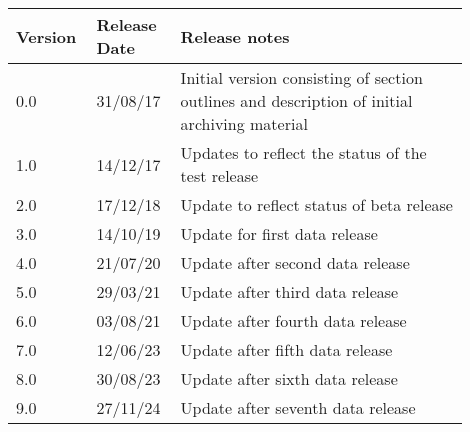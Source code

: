 \begin{table}[h]
\begin{tabular}{|p{0.15\linewidth}|p{0.15\linewidth}|p{0.60\linewidth}|}
\hline
\bfseries Version & \bfseries Release Date & \bfseries Release notes \\\hline
0.0	& 31/08/17	& Initial version consisting of section outlines and description of initial archiving material \\\hline
1.0	& 14/12/17	& Updates to reflect the status of the test release \\\hline
2.0	& 17/12/18	& Update to reflect status of beta release \\\hline
3.0	& 14/10/19	& Update for first data release \\\hline
4.0	& 21/07/20	& Update after second data release \\\hline
5.0 & 29/03/21  & Update after third data release \\\hline
6.0 & 03/08/21  & Update after fourth data release \\\hline
7.0 & 12/06/23  & Update after fifth data release \\\hline
8.0 & 30/08/23  & Update after sixth data release \\\hline
9.0 & 27/11/24  & Update after seventh data release \\\hline
\end{tabular}
\end{table}
\FloatBarrier
